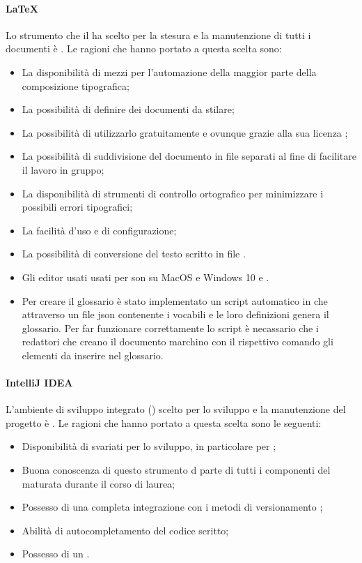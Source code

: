 \paragraph{LaTeX}
Lo strumento che il  ha scelto per la stesura e la manutenzione di tutti i documenti è . Le ragioni che hanno portato a questa scelta sono:
\begin{itemize}
\item La disponibilità di mezzi per l'automazione della maggior parte della composizione tipografica;
\item La possibilità di definire  dei documenti da stilare;
\item La possibilità di utilizzarlo gratuitamente e ovunque grazie alla sua licenza ;
\item La possibilità di suddivisione del documento in file separati al fine di facilitare il lavoro in gruppo;
\item La disponibilità di strumenti di controllo ortografico per minimizzare i possibili errori tipografici;
\item La facilità d'uso e di configurazione;
\item La possibilità di conversione del testo scritto in file .
\item Gli editor usati usati per  son  su MacOS e Windows 10 e  .
\item Per creare il glossario è stato implementato un script automatico in  che attraverso un file json contenente i vocabili e le loro definizioni genera il glossario. Per far funzionare correttamente lo script è necassario che i redattori che creano il documento marchino con il rispettivo comando  gli elementi da inserire nel glossario.
\end{itemize}

\paragraph{IntelliJ IDEA}
L'ambiente di sviluppo integrato () scelto per lo sviluppo e la manutenzione del progetto è . Le ragioni che hanno portato a questa scelta sono le seguenti:
\begin{itemize}
\item Disponibilità di svariati  per lo sviluppo, in particolare per ;
\item Buona conoscenza di questo strumento d parte di tutti i componenti del  maturata durante il corso di laurea;
\item Possesso di una completa integrazione con i metodi di versionamento ;
\item Abilità di autocompletamento del codice  scritto;
\item Possesso di un  .
\end{itemize}

